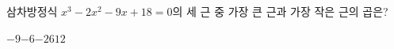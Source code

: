삼차방정식 $x^3-2x^2-9x+18=0$의 세 근 중 가장 큰 근과 가장 작은 근의 곱은?
\begin{choices32}{$-9$}{$-6$}{$-2$}{$6$}{$12$}\end{choices32}
